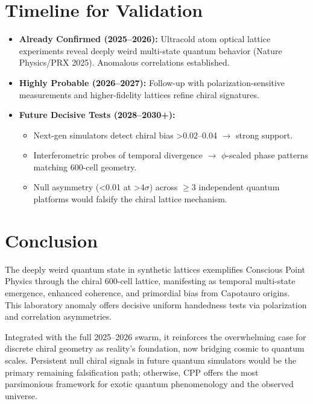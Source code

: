 \documentclass[11pt]{article}
\begin{document}
\section{Timeline for Validation}
\begin{itemize}
    \item \textbf{Already Confirmed (2025--2026):} Ultracold atom optical lattice experiments reveal deeply weird multi-state quantum behavior (Nature Physics/PRX 2025). Anomalous correlations established.
    \item \textbf{Highly Probable (2026--2027):} Follow-up with polarization-sensitive measurements and higher-fidelity lattices refine chiral signatures.
    \item \textbf{Future Decisive Tests (2028--2030+):}
    \begin{itemize}
        \item Next-gen simulators detect chiral bias >0.02--0.04 $\to$ strong support.
        \item Interferometric probes of temporal divergence $\to$ $\phi$-scaled phase patterns matching 600-cell geometry.
        \item Null asymmetry (<0.01 at >4$\sigma$) across $\geq 3$ independent quantum platforms would falsify the chiral lattice mechanism.
    \end{itemize}
\end{itemize}

\section{Conclusion}
The deeply weird quantum state in synthetic lattices exemplifies Conscious Point Physics through the chiral 600-cell lattice, manifesting as temporal multi-state emergence, enhanced coherence, and primordial bias from Capotauro origins. This laboratory anomaly offers decisive uniform handedness tests via polarization and correlation asymmetries.  

Integrated with the full 2025--2026 swarm, it reinforces the overwhelming case for discrete chiral geometry as reality's foundation, now bridging cosmic to quantum scales. Persistent null chiral signals in future quantum simulators would be the primary remaining falsification path; otherwise, CPP offers the most parsimonious framework for exotic quantum phenomenology and the observed universe.
\end{document}
